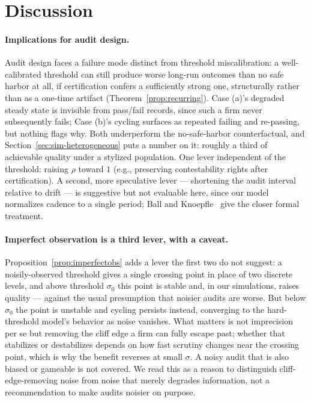 \section{Discussion}
\label{sec:discussion}

\paragraph{Implications for audit design.} Audit design faces a failure mode distinct from threshold miscalibration: a well-calibrated threshold can still produce worse long-run outcomes than no safe harbor at all, if certification confers a sufficiently strong one, structurally rather than as a one-time artifact (Theorem~\ref{prop:recurring}). Case (a)'s degraded steady state is invisible from pass/fail records, since such a firm never subsequently fails; Case (b)'s cycling surfaces as repeated failing and re-passing, but nothing flags why. Both underperform the no-safe-harbor counterfactual, and Section~\ref{sec:sim-heterogeneous} puts a number on it: roughly a third of achievable quality under a stylized population. One lever independent of the threshold: raising $\rho$ toward $1$ (e.g., preserving contestability rights after certification). A second, more speculative lever — shortening the audit interval relative to drift — is suggestive but not evaluable here, since our model normalizes cadence to a single period; Ball and Knoepfle~\cite{ball2023timing} give the closer formal treatment.

\paragraph{Imperfect observation is a third lever, with a caveat.} Proposition~\ref{prop:imperfectobs} adds a lever the first two do not suggest: a noisily-observed threshold gives a single crossing point in place of two discrete levels, and above threshold $\sigma_0$ this point is stable and, in our simulations, raises quality — against the usual presumption that noisier audits are worse. But below $\sigma_0$ the point is unstable and cycling persists instead, converging to the hard-threshold model's behavior as noise vanishes. What matters is not imprecision per se but removing the cliff edge a firm can fully escape past; whether that stabilizes or destabilizes depends on how fast scrutiny changes near the crossing point, which is why the benefit reverses at small $\sigma$. A noisy audit that is also biased or gameable is not covered. We read this as a reason to distinguish cliff-edge-removing noise from noise that merely degrades information, not a recommendation to make audits noisier on purpose.

